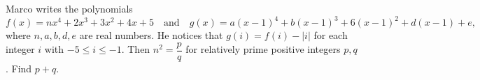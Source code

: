 Marco writes the polynomials
\[f(x)=nx^4+2x^3+3x^2+4x+5\quad\text{and}\quad g(x)=a(x-1)^4+b(x-1)^3+6(x-1)^2+d(x-1)+e,\]
where $n,a,b,d,e$ are real numbers. He notices that $g(i)=f(i)-|i|$ for each integer $i$ with $-5\le i\le-1$. Then $n^2=\dfrac pq$ for relatively prime positive integers $p,q$. Find $p+q$.
